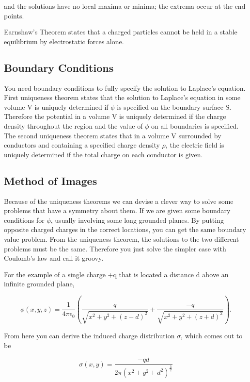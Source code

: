 \documentclass[preprint, review,12pt]{elsarticle}
\def\k{\frac{1}{4 \pi \epsilon_0}}
\def\9{\left(}
\def\0{\right)}
\begin{document}
and the solutions have no local maxima or minima; the extrema occur at the end points. 

Earnshaw's Theorem states that a charged particles cannot be held in a stable equilibrium by electrostatic forces alone.

\subsection{Boundary Conditions}

You need boundary conditions to fully specify the solution to Laplace's equation. First uniqueness theorem states that the solution to Laplace's equation in some volume V is uniquely determined if $\phi$ is specified on the boundary surface S. Therefore the potential in a volume V is uniquely determined if the charge density throughout the region and the value of $\phi$ on all boundaries is specified. The second uniqueness theorem states that in a volume V surrounded by conductors and containing a specified charge density $\rho$, the electric field is uniquely determined if the total charge on each conductor is given.

\subsection{Method of Images}

Because of the uniqueness theorems we can devise a clever way to solve some problems that have a symmetry about them. If we are given some boundary conditions for $\phi$, usually involving some long grounded planes. By putting opposite charged charges in the correct locations, you can get the same boundary value problem. From the uniqueness theorem, the solutions to the two different problems must be the same. Therefore you just solve the simpler case with Coulomb's law and call it groovy.

For the example of a single charge +q that is located a distance d above an infinite grounded plane, 

\begin{equation}
    \phi(x,y,z) = \k \9 \frac{q}{\sqrt{x^2+y^2+(z-d)^2}} + \frac{-q}{\sqrt{x^2+y^2+(z+d)^2}} \0 .
\end{equation}

From here you can derive the induced charge distribution $\sigma$, which comes out to be

\begin{equation}
    \sigma(x,y) = \frac{-qd}{2\pi (x^2+y^2+d^2)^{\frac{3}{2}}}
\end{equation}
\end{document}
